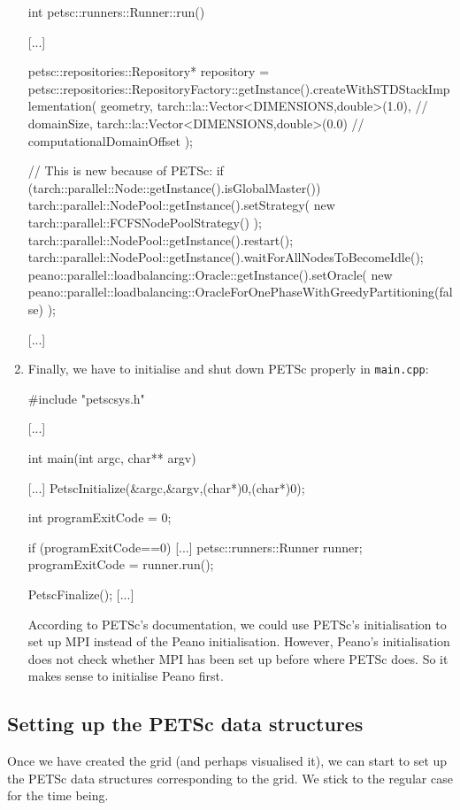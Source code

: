 \begin{enumerate}
\begin{code}
int petsc::runners::Runner::run() {

  [...]

  petsc::repositories::Repository* repository = 
    petsc::repositories::RepositoryFactory::getInstance().createWithSTDStackImplementation(
      geometry,
      tarch::la::Vector<DIMENSIONS,double>(1.0),   // domainSize,
      tarch::la::Vector<DIMENSIONS,double>(0.0)    // computationalDomainOffset
    );
  

  // This is new because of PETSc:
  if (tarch::parallel::Node::getInstance().isGlobalMaster()) {
    tarch::parallel::NodePool::getInstance().setStrategy(
      new tarch::parallel::FCFSNodePoolStrategy()
    );
  }
  tarch::parallel::NodePool::getInstance().restart();
  tarch::parallel::NodePool::getInstance().waitForAllNodesToBecomeIdle();
  peano::parallel::loadbalancing::Oracle::getInstance().setOracle(
    new peano::parallel::loadbalancing::OracleForOnePhaseWithGreedyPartitioning(false)
  );

  [...]
}
  \end{code}
  \item Finally, we have to initialise and shut down PETSc properly in
  \texttt{main.cpp}:
  \begin{code}
#include "petscsys.h"

[...]

int main(int argc, char** argv) {
  [...]
  PetscInitialize(&argc,&argv,(char*)0,(char*)0);

  int programExitCode = 0;

  if (programExitCode==0) {
    [...]
    petsc::runners::Runner runner;
    programExitCode = runner.run();
  }

  PetscFinalize();
  [...]
}  
  \end{code}
  According to PETSc's documentation, we could use PETSc's initialisation to set
  up MPI instead of the Peano initialisation. However, Peano's initialisation
  does not check whether MPI has been set up before where PETSc does. So it
  makes sense to initialise Peano first.
\end{enumerate}




\subsection{Setting up the PETSc data structures}

Once we have created the grid (and perhaps visualised it), we can start to set
up the PETSc data structures corresponding to the grid. 
We stick to the regular case for the time being.

